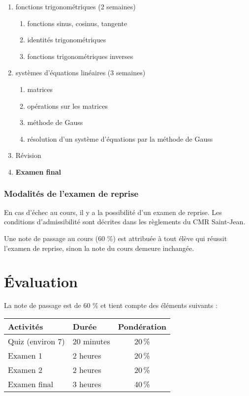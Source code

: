 \documentclass[fleqn,twoside,12pt,letterpaper]{article}
\begin{document}
\begin{enumerate}
	\item fonctions trigonométriques (2 semaines)
	  \begin{enumerate}
	    \item fonctions sinus, cosinus, tangente
	    \item identités trigonométriques
	    \item fonctions trigonométriques inverses
	  \end{enumerate}
	
	\item systèmes d'équations linéaires (3 semaines)
	  \begin{enumerate}
	    \item matrices
	    \item opérations sur les matrices
	    \item méthode de Gauss
	    \item résolution d'un système d'équations par la méthode de Gauss
	  \end{enumerate}
	
	\item Révision
	
	\item {\bf Examen final}
  \end{enumerate}

\subsubsection{Modalités de l'examen de reprise}

En cas d'échec au cours, il y a la possibilité d'un examen de reprise.  Les conditions d'admissibilité sont décrites dans les règlements du
CMR Saint-Jean.

Une note de passage au cours (60 \%) est attribuée à tout élève qui réussit
l'examen de reprise, sinon la note du cours demeure inchangée.


\section{Évaluation}

La note de passage est de 60 \% et tient compte des éléments suivants :
\begin{center}
\begin{tabular}{|l|l|c|}
\hline
\bfseries{Activités}&\bfseries{Durée}&\bfseries{Pondération}\\\hline\hline
Quiz (environ 7) & 20 minutes &20\,\%\\\hline
Examen 1&2 heures&20\,\%\\\hline
Examen 2&2 heures&20\,\%\\\hline
Examen final&3 heures&40\,\%\\\hline
\end{tabular}
\end{center}
\end{document}
